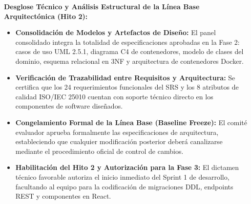 \documentclass[12pt,a4paper]{article}
\begin{document}
\noindent
\noindent
\textbf{Desglose Técnico y Análisis Estructural de la Línea Base Arquitectónica (Hito 2):}
\begin{itemize}[leftmargin=1.5em, itemsep=3pt]
    \item \textbf{Consolidación de Modelos y Artefactos de Diseño:} El panel consolidado integra la totalidad de especificaciones aprobadas en la Fase 2: casos de uso UML 2.5.1, diagrama C4 de contenedores, modelo de clases del dominio, esquema relacional en 3NF y arquitectura de contenedores Docker.
    \item \textbf{Verificación de Trazabilidad entre Requisitos y Arquitectura:} Se certifica que los 24 requerimientos funcionales del SRS y los 8 atributos de calidad ISO/IEC 25010 cuentan con soporte técnico directo en los componentes de software diseñados.
    \item \textbf{Congelamiento Formal de la Línea Base (Baseline Freeze):} El comité evaluador aprueba formalmente las especificaciones de arquitectura, estableciendo que cualquier modificación posterior deberá canalizarse mediante el procedimiento oficial de control de cambios.
    \item \textbf{Habilitación del Hito 2 y Autorización para la Fase 3:} El dictamen técnico favorable autoriza el inicio inmediato del Sprint 1 de desarrollo, facultando al equipo para la codificación de migraciones DDL, endpoints REST y componentes en React.
\end{itemize}
\end{document}
